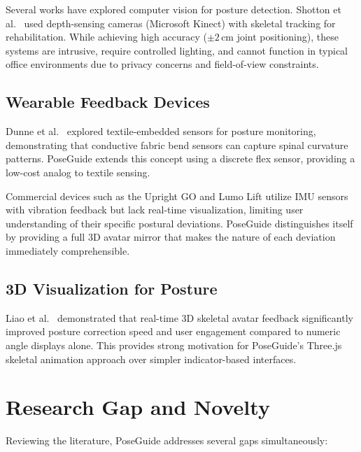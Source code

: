 \documentclass[12pt,a4paper]{report}
\begin{document}
Several works have explored computer vision for posture detection. Shotton et al.\ \cite{shotton2011} used depth-sensing cameras (Microsoft Kinect) with skeletal tracking for rehabilitation. While achieving high accuracy ($\pm 2$\,cm joint positioning), these systems are intrusive, require controlled lighting, and cannot function in typical office environments due to privacy concerns and field-of-view constraints.

\subsection{Wearable Feedback Devices}

Dunne et al.\ \cite{dunne2007} explored textile-embedded sensors for posture monitoring, demonstrating that conductive fabric bend sensors can capture spinal curvature patterns. PoseGuide extends this concept using a discrete flex sensor, providing a low-cost analog to textile sensing.

Commercial devices such as the Upright GO \cite{upright2022} and Lumo Lift \cite{lumo2022} utilize IMU sensors with vibration feedback but lack real-time visualization, limiting user understanding of their specific postural deviations. PoseGuide distinguishes itself by providing a full 3D avatar mirror that makes the nature of each deviation immediately comprehensible.

\subsection{3D Visualization for Posture}

Liao et al.\ \cite{liao2020} demonstrated that real-time 3D skeletal avatar feedback significantly improved posture correction speed and user engagement compared to numeric angle displays alone. This provides strong motivation for PoseGuide's Three.js skeletal animation approach over simpler indicator-based interfaces.

\section{Research Gap and Novelty}

Reviewing the literature, PoseGuide addresses several gaps simultaneously:
\end{document}
